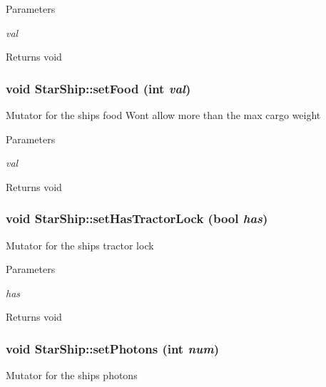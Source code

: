 \begin{DoxyParams}{Parameters}
\item[{\em val}]\end{DoxyParams}
\begin{DoxyReturn}{Returns}
void 
\end{DoxyReturn}
\hypertarget{classStarShip_a5c1681ff3b6d20aa7cbb6bce36ab74fe}{
\subsubsection[{setFood}]{\setlength{\rightskip}{0pt plus 5cm}void StarShip::setFood (int {\em val})}}
\label{da/d97/classStarShip_a5c1681ff3b6d20aa7cbb6bce36ab74fe}
Mutator for the ships food Wont allow more than the max cargo weight


\begin{DoxyParams}{Parameters}
\item[{\em val}]\end{DoxyParams}
\begin{DoxyReturn}{Returns}
void 
\end{DoxyReturn}
\hypertarget{classStarShip_a44bc85e4cbd29a883d1068a08ab6b4b4}{
\subsubsection[{setHasTractorLock}]{\setlength{\rightskip}{0pt plus 5cm}void StarShip::setHasTractorLock (bool {\em has})}}
\label{da/d97/classStarShip_a44bc85e4cbd29a883d1068a08ab6b4b4}
Mutator for the ships tractor lock


\begin{DoxyParams}{Parameters}
\item[{\em has}]\end{DoxyParams}
\begin{DoxyReturn}{Returns}
void 
\end{DoxyReturn}
\hypertarget{classStarShip_a207cd846544ef333a25b14d737fa934a}{
\subsubsection[{setPhotons}]{\setlength{\rightskip}{0pt plus 5cm}void StarShip::setPhotons (int {\em num})}}
\label{da/d97/classStarShip_a207cd846544ef333a25b14d737fa934a}
Mutator for the ships photons


